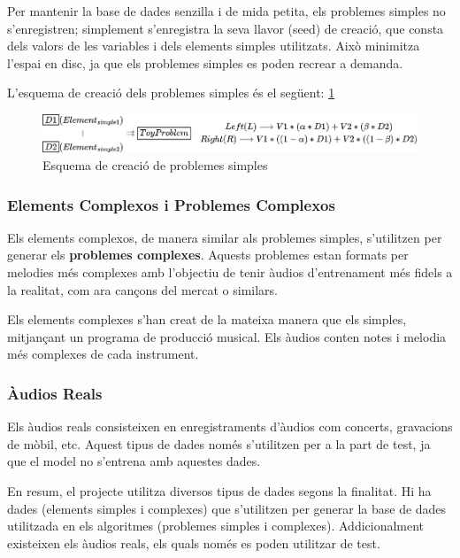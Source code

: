 \documentclass[10pt,a4paper,twocolumn,twoside]{article}
\begin{document}
Per mantenir la base de dades senzilla i de mida petita, els problemes simples no s'enregistren; simplement s'enregistra la seva llavor (seed) de creació, que consta dels valors de les variables i dels elements simples utilitzats. Això minimitza l'espai en disc, ja que els problemes simples es poden recrear a demanda.

L'esquema de creació dels problemes simples és el següent: \ref{fig:data-generator-formula}
\begin{figure}[h]
    \centering
    \includegraphics[width=1\linewidth]{img/data_generator_formula.png}
    \caption{Esquema de creació de problemes simples}
    \label{fig:data-generator-formula}
\end{figure}

\subsubsection{Elements Complexos i Problemes Complexos}

Els elements complexos, de manera similar als problemes simples, s'utilitzen per generar els \textbf{problemes complexes}. Aquests problemes estan formats per melodies més complexes amb l'objectiu de tenir àudios d'entrenament més fidels a la realitat, com ara cançons del mercat o similars.

Els elements complexes s'han creat de la mateixa manera que els simples, mitjançant un programa de producció musical. Els àudios conten notes i melodia més complexes de cada instrument.

\subsubsection{Àudios Reals}

Els àudios reals consisteixen en enregistraments d'àudios com concerts, gravacions de mòbil, etc. Aquest tipus de dades només s'utilitzen per a la part de test, ja que el model no s'entrena amb aquestes dades.

En resum, el projecte utilitza diversos tipus de dades segons la finalitat. Hi ha dades (elements simples i complexes) que s'utilitzen per generar la base de dades utilitzada en els algoritmes (problemes simples i complexes). Addicionalment existeixen els àudios reals, els quals només es poden utilitzar de test. 
\end{document}
